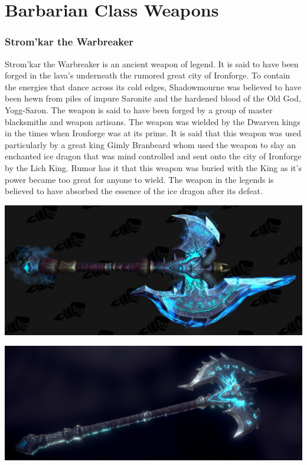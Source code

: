 \section{Barbarian Class Weapons}

\subsubsection{Strom'kar the Warbreaker}

Strom'kar the Warbreaker is an ancient weapon of legend. It is said to have been forged in the lava's underneath the rumored great city of Ironforge. To contain the energies that dance across its cold edges, Shadowmourne was believed to have been hewn from piles of impure Saronite and the hardened blood of the Old God, Yogg-Saron. The weapon is said to have been forged by a group of master blacksmiths and weapon artisans. The weapon was wielded by the Dwarven kings in the times when Ironforge was at its prime. It is said that this weapon was used particularly by a great king Gimly Branbeard whom used the weapon to slay an enchanted ice dragon that was mind controlled and sent onto the city of Ironforge by the Lich King. Rumor has it that this weapon was buried with the King as it's power became too great for anyone to wield. The weapon in the legends is believed to have absorbed the essence of the ice dragon after its defeat.

\begin{center}
	\includegraphics[width=\linewidth]{img/weapons/stromkar.jpg}
	
	\includegraphics[width=\linewidth]{img/weapons/2c4b402131fbd1a0bc1da845d64002ed.jpg}
\end{center}

